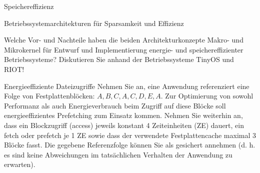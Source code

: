 \documentclass[10pt, a4paper]{exam}
\begin{document}
\begin{questions}

  \question Speichereffizienz

  \question  Betriebssystemarchitekturen für Sparsamkeit und Effizienz

  Welche Vor- und Nachteile haben die beiden Architekturkonzepte Makro- und Mikrokernel für Entwurf und Implementierung energie- und speichereffizienter Betriebssysteme? Diskutieren Sie anhand der Betriebssysteme TinyOS und RIOT!
  \begin{solution}
  \end{solution}

  \question  Energieeffiziente Dateizugriffe
  Nehmen Sie an, eine Anwendung referenziert eine Folge von Festplattenblöcken: $A,B,C,A,C,D,E,A$.
  Zur Optimierung von sowohl Performanz als auch Energieverbrauch beim Zugriff auf diese Blöcke soll energieeffizientes Prefetching zum Einsatz kommen. Nehmen Sie weiterhin an, dass ein Blockzugriff (access) jeweils konstant 4 Zeiteinheiten (ZE) dauert, ein fetch oder prefetch je 1 ZE sowie dass der verwendete Festplattencache maximal 3 Blöcke fasst. Die gegebene Referenzfolge können Sie als gesichert annehmen (d. h. es sind keine Abweichungen im tatsächlichen Verhalten der Anwendung zu erwarten).
  \begin{parts}

\end{parts}
\end{questions}
\end{document}
